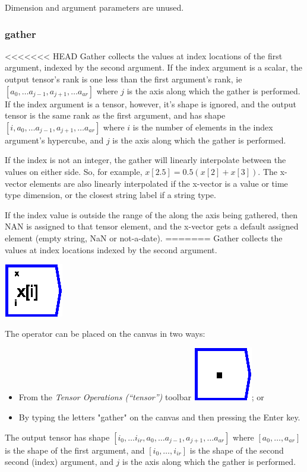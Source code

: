 Dimension and argument parameters are unused.

\subsubsection{gather}

\label{Operation:gather}

<<<<<<< HEAD
Gather collects the values at index locations of the first argument, indexed by the second
argument. If the index argument is a scalar, the output tensor's rank
is one less than the first argument's rank, ie 
$[a_0,\ldots a_{j-1},a_{j+1},\ldots a_{ar}]$ where $j$ is the axis
along which the gather is performed. If the index argument is a
tensor, however, it's shape is ignored, and the output tensor is the
same rank as the first argument, and has shape
$[i, a_0,\ldots a_{j-1},a_{j+1},\ldots a_{ar}]$ where
$i$ is the number of elements in the index argument's hypercube, and $j$ is the axis along which the gather is performed.

If the index is not an integer, the gather will linearly interpolate
between the values on either side. So, for example,
$x[2.5] = 0.5 (x[2]+x[3])$. The x-vector elements are also linearly
interpolated if the x-vector is a value or time type dimension, or the
closest string label if a string type.

If the index value is outside the range of the
 along the axis being gathered, then NAN
is assigned to that tensor element, and the x-vector gets a default
assigned element (empty string, NaN or not-a-date).
=======
Gather collects the values at index locations indexed by the second
argument.

\includegraphics{images/gather}

The operator can be placed on the canvas in two ways:
\begin{itemize}
\item From the \emph{Tensor Operations (``tensor'')} toolbar \includegraphics{images/innerProduct};
or 
\item By typing the letters "gather" on the canvas and then pressing the
Enter key.
\end{itemize}
The output tensor has shape $[i_{0},\ldots i_{ir},a_{0},\ldots a_{j-1},a_{j+1},\ldots a_{ar}]$
where $[a_{0},\ldots,a_{ar}]$ is the shape of the first argument,
and $[i_{0},\ldots,i_{ir}]$ is the shape of the second second (index)
argument, and $j$ is the axis along which the gather is performed.

